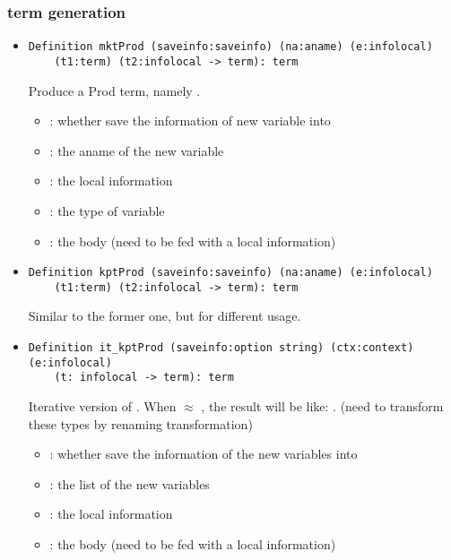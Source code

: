 \documentclass[a4paper,UKenglish,cleveref, autoref, thm-restate]{lipics-v2021}
\begin{document}
\subsubsection{term generation}
\begin{itemize}

\item
\begin{lstlisting}[language = {Coq}, basicstyle = \small]
Definition mktProd (saveinfo:saveinfo) (na:aname) (e:infolocal) 
    (t1:term) (t2:infolocal -> term): term
\end{lstlisting}
Produce a Prod term, namely .
\begin{itemize}
    \item {}: whether save the information of new variable into 
    \item {}: the aname of the new variable
    \item {}: the local information
    \item {}: the type of variable
    \item {}: the body (need to be fed with a local information)
\end{itemize}



\item
\begin{lstlisting}[language = {Coq}, basicstyle = \small]
Definition kptProd (saveinfo:saveinfo) (na:aname) (e:infolocal) 
    (t1:term) (t2:infolocal -> term): term
\end{lstlisting}
Similar to the former one, but for different usage.

\item
\begin{lstlisting}[language = {Coq}, basicstyle = \small]
Definition it_kptProd (saveinfo:option string) (ctx:context) (e:infolocal) 
    (t: infolocal -> term): term
\end{lstlisting}
Iterative version of .
When  $\approx$ \coqe{[vk; ... v2; v1]}, the result will be like:
. (need to transform these types by renaming transformation)
\begin{itemize}
    \item {}: whether save the information of the new variables into 
    \item {}: the list of the new variables
    \item {}: the local information
    \item {}: the body (need to be fed with a local information)
\end{itemize}


\end{itemize}
\end{document}
